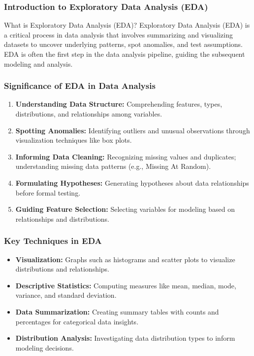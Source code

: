 \documentclass[aspectratio=169]{beamer}
\begin{document}
\begin{frame}[fragile]
    \frametitle{Introduction to Exploratory Data Analysis (EDA)}
    \begin{block}{What is Exploratory Data Analysis (EDA)?}
        Exploratory Data Analysis (EDA) is a critical process in data analysis that involves summarizing and visualizing datasets to uncover underlying patterns, spot anomalies, and test assumptions.
        EDA is often the first step in the data analysis pipeline, guiding the subsequent modeling and analysis.
    \end{block}
\end{frame}

\begin{frame}[fragile]
    \frametitle{Significance of EDA in Data Analysis}
    \begin{enumerate}
        \item \textbf{Understanding Data Structure:} Comprehending features, types, distributions, and relationships among variables.
        \item \textbf{Spotting Anomalies:} Identifying outliers and unusual observations through visualization techniques like box plots.
        \item \textbf{Informing Data Cleaning:} Recognizing missing values and duplicates; understanding missing data patterns (e.g., Missing At Random).
        \item \textbf{Formulating Hypotheses:} Generating hypotheses about data relationships before formal testing.
        \item \textbf{Guiding Feature Selection:} Selecting variables for modeling based on relationships and distributions.
    \end{enumerate}
\end{frame}

\begin{frame}[fragile]
    \frametitle{Key Techniques in EDA}
    \begin{itemize}
        \item \textbf{Visualization:} Graphs such as histograms and scatter plots to visualize distributions and relationships.
        \item \textbf{Descriptive Statistics:} Computing measures like mean, median, mode, variance, and standard deviation.
        \item \textbf{Data Summarization:} Creating summary tables with counts and percentages for categorical data insights.
        \item \textbf{Distribution Analysis:} Investigating data distribution types to inform modeling decisions.
    \end{itemize}
\end{frame}
\end{document}
